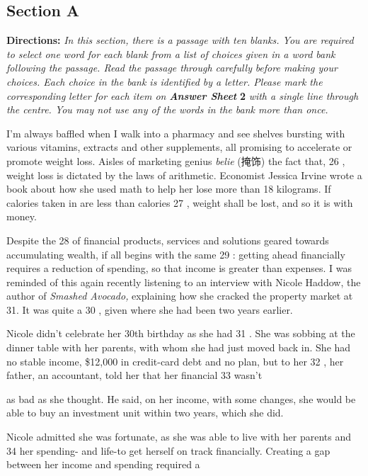 \documentclass[UTF8,11pt]{ctexart}
\begin{document}
\subsection*{\textbf{Section A}}


\textbf{Directions: }\textit{In this section, there is a passage with ten blanks. You are required to select one word for each} \textit{blank from a list of choices given in a word bank following the passage. Read the passage through carefully} \textit{before making your choices. Each choice in the bank is identified by a letter. Please mark the corresponding} \textit{letter for each item on }\textbf{\textit{Answer Sheet }}\textbf{2 }\textit{with a single line through the centre. You may not use any of the} \textit{words in the bank more than once.}


I'm always baffled when I walk into a pharmacy and see shelves bursting with various vitamins, extracts and other supplements, all promising to accelerate or promote weight loss. Aisles of marketing genius \textit{belie }(掩饰) the fact that, 26 , weight loss is dictated by the laws of arithmetic. Economist Jessica Irvine wrote a book about how she used math to help her lose more than 18 kilograms. If calories taken in are less than calories 27 , weight shall be lost, and so it is with money.


Despite the 28 of financial products, services and solutions geared towards accumulating wealth, if all begins with the same 29 : getting ahead financially requires a reduction of spending, so that income is greater than expenses. I was reminded of this again recently listening to an interview with Nicole Haddow, the author of \textit{Smashed Avocado, }explaining how she cracked the property market at 31. It was quite a 30 , given where she had been two years earlier.


Nicole didn't celebrate her 30th birthday as she had 31 . She was sobbing at the dinner table with her parents, with whom she had just moved back in. She had no stable income, \$12,000 in credit-card debt and no plan, but to her 32 , her father, an accountant, told her that her financial 33 wasn't


as bad as she thought. He said, on her income, with some changes, she would be able to buy an investment unit within two years, which she did.


Nicole admitted she was fortunate, as she was able to live with her parents and 34 her spending- and life-to get herself on track financially. Creating a gap between her income and spending required a
\end{document}
